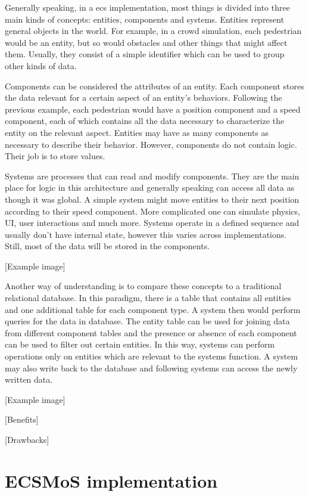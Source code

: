 \documentclass[twoside, 11pt]{article}
\begin{document}
Generally speaking, in a \gls{ecs} implementation, most things is divided into three main kinds of concepts: entities, components and systems. Entities represent general objects in the world. For example, in a crowd simulation, each pedestrian would be an entity, but so would obstacles and other things that might affect them. Usually, they consist of a simple identifier which can be used to group other kinds of data.

Components can be considered the attributes of an entity. Each component stores the data relevant for a certain aspect of an entity's behaviors. Following the previous example, each pedestrian would have a position component and a speed component, each of which contains all the data necessary to characterize the entity on the relevant aspect. Entities may have as many components as necessary to describe their behavior. However, components do not contain logic. Their job is to store values.

Systems are processes that can read and modify components. They are the main place for logic in this architecture and generally speaking can access all data as though it was global. A simple system might move entities to their next position according to their speed component. More complicated one can simulate physics, UI, user interactions and much more. Systems operate in a defined sequence and usually don't have internal state, however this varies across implementations. Still, most of the data will be stored in the components.

[Example image]

Another way of understanding is to compare these concepts to a traditional relational database. In this paradigm, there is a table that contains all entities and one additional table for each component type. A system then would perform queries for the data in database. The entity table can be used for joining data from different component tables and the presence or absence of each component can be used to filter out certain entities. In this way, systems can perform operations only on entities which are relevant to the systems function. A system may also write back to the database and following systems can access the newly written data.

[Example image]




[Benefits]

[Drawbacks]

\section{ECSMoS implementation}
\end{document}
